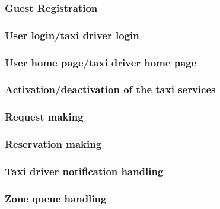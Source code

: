\subsubsection{Guest Registration}



\subsubsection{User login/taxi driver login}


\subsubsection{User home page/taxi driver home page}  



\subsubsection{Activation/deactivation of the taxi services}



\subsubsection{Request making}



\subsubsection{Reservation making}



\subsubsection{Taxi driver notification handling}

        
        
\subsubsection{Zone queue handling}

    

